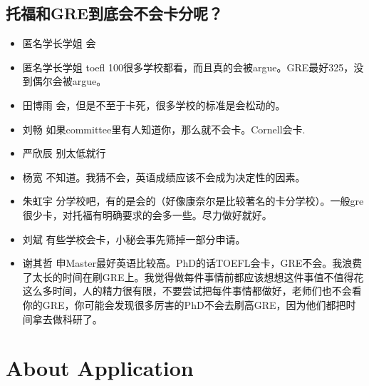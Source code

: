 \documentclass{vivid_layout}
\begin{document}
\subsection{托福和GRE到底会不会卡分呢？}
\begin{itemize}
\item  {\name 匿名学长学姐}  \quad 会
\item {\name 匿名学长学姐}  \quad  toefl 100很多学校都看，而且真的会被argue。GRE最好325，没到偶尔会被argue。
\item  { 田博雨}  \quad 会，但是不至于卡死，很多学校的标准是会松动的。
\item  { 刘畅}  \quad 如果committee里有人知道你，那么就不会卡。Cornell会卡.
\item  { 严欣辰}  \quad 别太低就行
\item  { 杨宽}  \quad 不知道。我猜不会，英语成绩应该不会成为决定性的因素。
\item  { 朱虹宇}  \quad 分学校吧，有的是会的（好像康奈尔是比较著名的卡分学校）。一般gre很少卡，对托福有明确要求的会多一些。尽力做好就好。
\item  { 刘斌}  \quad 有些学校会卡，小秘会事先筛掉一部分申请。
\item  { 谢其哲}  \quad 申Master最好英语比较高。PhD的话TOEFL会卡，GRE不会。我浪费了太长的时间在刷GRE上。我觉得做每件事情前都应该想想这件事值不值得花这么多时间，人的精力很有限，不要尝试把每件事情都做好，老师们也不会看你的GRE，你可能会发现很多厉害的PhD不会去刷高GRE，因为他们都把时间拿去做科研了。
\end{itemize}


\section{About Application}
\addtocounter{section}{1}
\setcounter{subsection}{0}
\end{document}
